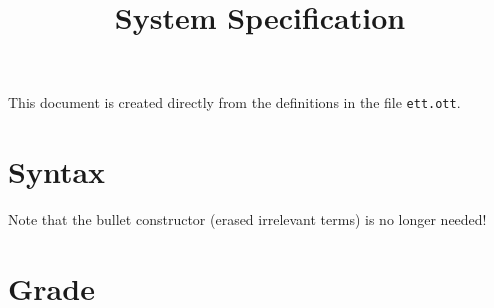 \documentclass{article}
\title{System Specification}
\begin{document}
\maketitle

This document is created directly from the definitions in the file
{\texttt{ett.ott}}.

\section{Syntax}
\ottgrammartabular{
\otttm\ottinterrule
\ottcontext\ottafterlastrule
}
Note that the bullet constructor (erased irrelevant terms) is no longer needed!

\section{Grade}
\end{document}

